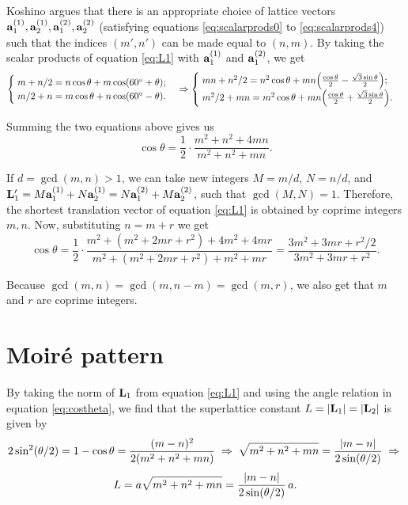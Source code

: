 Koshino \cite{koshino2012} argues that there is an appropriate choice of lattice vectors $\vb{a}_1^{(1)}, \vb{a}_2^{(1)}, \vb{a}_1^{(2)}, \vb{a}_2^{(2)}$ (satisfying equations \ref{eq:scalarprods0} to \ref{eq:scalarprods4}) such that the indices $(m',n')$ can be made equal to $(n,m)$. By taking the scalar products of equation \ref{eq:L1} with $\vb{a}_1^{(1)}$ and $\vb{a}_1^{(2)}$, we get
$$
\begin{cases}
\; m + n/2 = n \cos\theta + m \cos(60^\circ + \theta); \\
\; m/2 + n = m \cos\theta + n \cos(60^\circ - \theta).
\end{cases}
\Rightarrow
\begin{cases}
\; mn + n^2/2 = n^2 \cos\theta + mn \qty(\frac{\cos\theta}{2}
- \frac{\sqrt{3} \sin\theta}{2}); \\
\; m^2/2 + mn = m^2 \cos\theta + mn \qty(\frac{\cos\theta}{2}
+ \frac{\sqrt{3} \sin\theta}{2}).
\end{cases}
$$

Summing the two equations above gives us
\begin{equation} \label{eq:costheta}
\boxed{\cos\theta = \frac{1}{2} \cdot \frac{m^2 + n^2 + 4mn}{m^2 + n^2 + mn}.}
\end{equation}

If $d = \gcd(m, n) > 1$, we can take new integers $M = m/d$, $N = n/d$, and $\vb{L}_1' = M\vb{a}_1^{(1)} + N\vb{a}_2^{(1)} = N\vb{a}_1^{(2)} + M\vb{a}_2^{(2)}$, such that $\gcd(M, N) = 1$. Therefore, the shortest translation vector of equation \ref{eq:L1} is obtained by coprime integers $m, n$. Now, substituting $n = m + r$ we get
\begin{equation} \label{eq:costheta-r}
\boxed{\cos\theta = \frac{1}{2} \cdot \frac{m^2 + (m^2 + 2mr + r^2) + 4m^2 + 4mr}{m^2 + (m^2 + 2mr + r^2) + m^2 + mr} =
\frac{3 m^2 + 3mr + r^2/2}{3m^2 + 3mr + r^2}. }
\end{equation}

Because $\gcd(m, n) = \gcd(m, n-m) = \gcd(m, r)$, we also get that $m$ and $r$ are coprime integers.

\n



\pagebreak

\section{Moiré pattern}

By taking the norm of $\vb{L}_1$ from equation \ref{eq:L1} and using the angle relation in equation \ref{eq:costheta}, we find that the superlattice constant $L = \abs{\vb{L}_1} = \abs{\vb{L}_2}$ is given by
$$
2\sin[2](\theta/2) = 1 - \cos\theta = \frac{(m-n)^2}{2(m^2+n^2+mn)} \; \Rightarrow \;
\sqrt{m^2+n^2+mn} = \frac{\abs{m-n}}{2\sin(\theta/2)} \; \Rightarrow \;
$$
\begin{equation} \label{eq:L-commensurate}
L = a\sqrt{m^2 + n^2 + mn} = \frac{\abs{m-n}}{2 \sin(\theta/2)} \, a.
\end{equation}

